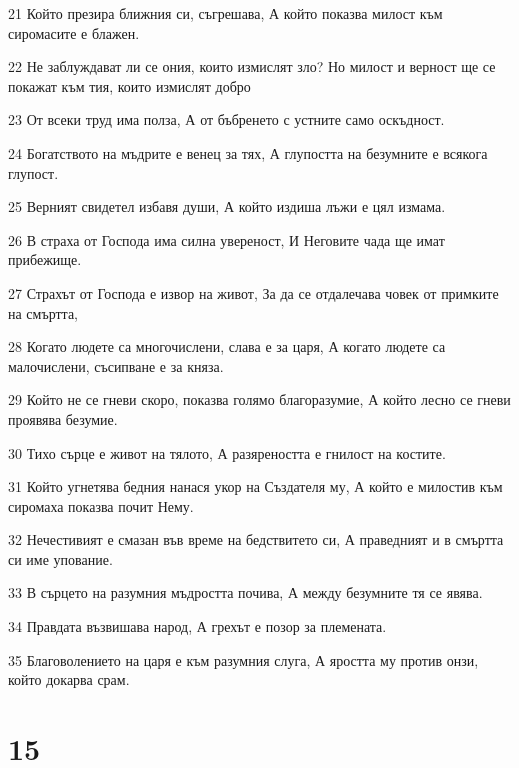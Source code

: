 \par 21 Който презира ближния си, съгрешава, А който показва милост към сиромасите е блажен.
\par 22 Не заблуждават ли се ония, които измислят зло? Но милост и верност ще се покажат към тия, които измислят добро
\par 23 От всеки труд има полза, А от бъбренето с устните само оскъдност.
\par 24 Богатството на мъдрите е венец за тях, А глупостта на безумните е всякога глупост.
\par 25 Верният свидетел избавя души, А който издиша лъжи е цял измама.
\par 26 В страха от Господа има силна увереност, И Неговите чада ще имат прибежище.
\par 27 Страхът от Господа е извор на живот, За да се отдалечава човек от примките на смъртта,
\par 28 Когато людете са многочислени, слава е за царя, А когато людете са малочислени, съсипване е за княза.
\par 29 Който не се гневи скоро, показва голямо благоразумие, А който лесно се гневи проявява безумие.
\par 30 Тихо сърце е живот на тялото, А разяреността е гнилост на костите.
\par 31 Който угнетява бедния нанася укор на Създателя му, А който е милостив към сиромаха показва почит Нему.
\par 32 Нечестивият е смазан във време на бедствитето си, А праведният и в смъртта си име упование.
\par 33 В сърцето на разумния мъдростта почива, А между безумните тя се явява.
\par 34 Правдата възвишава народ, А грехът е позор за племената.
\par 35 Благоволението на царя е към разумния слуга, А яростта му против онзи, който докарва срам.

\chapter{15}

